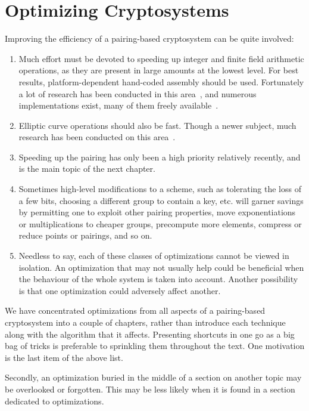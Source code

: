 \chapter{Optimizing Cryptosystems}

Improving the efficiency of a pairing-based cryptosystem can be quite involved:

\begin{enumerate}
\item
Much effort must be devoted to speeding up
integer and finite field arithmetic operations, as they are present
in large amounts at the lowest level. For best results, platform-dependent
hand-coded assembly should be used.
Fortunately a lot of research has been conducted in this area~\cite{taocp2},
and numerous implementations exist, many of them freely available~\cite{gmp, miracl}.
\item
Elliptic curve operations should also be fast. Though a newer subject,
much research has been conducted on this area~\cite{bss}.
\item
Speeding up the pairing has only been a high priority relatively recently,
and is the main topic of the next chapter.
\item
Sometimes high-level modifications to a scheme, such as tolerating the
loss of a few bits, choosing a different group to contain a key, etc.
will garner savings by permitting one to exploit other pairing properties,
move exponentiations or multiplications to cheaper groups,
precompute more elements, compress or reduce points or pairings, and so on.
\item
Needless to say, each of these classes of optimizations cannot be viewed
in isolation. An optimization that may not usually help could be beneficial
when the behaviour of the whole system is taken into account.
Another possibility is that
one optimization could adversely affect another.
\end{enumerate}

We have concentrated optimizations from all aspects of
a pairing-based cryptosystem into a couple of chapters,
rather than introduce each technique along with the algorithm that it
affects. Presenting shortcuts in one go as a big bag of tricks is
preferable to sprinkling them throughout the text.
One motivation is the last item of the above list.

Secondly, an optimization buried in the middle of a section on another topic
may be overlooked or forgotten. This may be less likely when it is found in
a section dedicated to optimizations.

